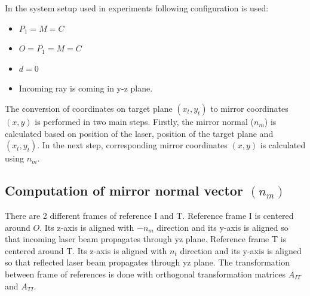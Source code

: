 In the system setup used in experiments following configuration is used:
\begin{itemize}
    \item $P_{1} = M = C$
    \item $O = P_{1} = M = C$
    \item $d = 0$
    \item Incoming ray is coming in y-z plane.
\end{itemize}


The conversion of coordinates on target plane $(x_{t}, y_{t})$ to mirror
coordinates $(x, y)$ is performed in two main steps. Firstly,
the mirror normal ($n_{m}$) is calculated based on position of the
laser, position of the target plane and $(x_{t}, y_{t})$. In the next
step, corresponding mirror coordinates $(x, y)$ is calculated using $n_{m}$.

\subsection{Computation of mirror normal vector $(n_{m})$}
\label{subsec:compute_mirror_normal}

There are 2 different frames of reference I and T. Reference
frame I is centered around $O$. Its z-axis is aligned with $-n_{m}$ direction
and its y-axis is aligned so that incoming laser beam propagates
through yz plane.  Reference frame T is centered around T.
Its z-axis is aligned with $n_{t}$ direction and its y-axis is aligned
so that reflected laser beam propagates through yz plane.
The transformation between frame of references is done with orthogonal
transformation matrices $A_{IT}$ and $A_{TI}$.



